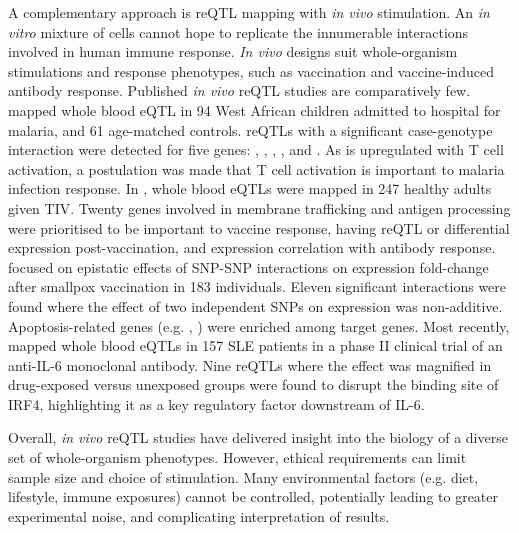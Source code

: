\begin{outline}
A complementary approach is \gls{reQTL} mapping with \textit{in vivo} stimulation.
An \textit{in vitro} mixture of cells cannot hope to replicate the innumerable interactions involved in human immune response.
\textit{In vivo} designs suit whole-organism stimulations and response phenotypes,
such as vaccination and vaccine-induced antibody response.
%
Published \textit{in vivo} \gls{reQTL} studies are comparatively few.
\textcite{idaghdour2012EvidenceAdditiveInteraction} mapped whole blood \gls{eQTL} in 94 West African children admitted to hospital for malaria, and 61 age-matched controls.
\glspl{reQTL} with a significant case-genotype interaction were detected for five genes:
, , , , and .
As  is upregulated with T cell activation, a postulation was made that T cell activation is important to malaria infection response.
In \textcite{franco2013IntegrativeGenomicAnalysis}, whole blood \glspl{eQTL} were mapped in 247 healthy adults given \gls{TIV}.
Twenty genes involved in membrane trafficking and antigen processing were prioritised to be important to vaccine response,
having \gls{reQTL} or differential expression post-vaccination, and expression correlation with antibody response.
\textcite{lareau2016InteractionQuantitativeTrait} focused on epistatic effects of \gls{SNP}-\gls{SNP} interactions on expression fold-change after smallpox vaccination in 183 individuals.
Eleven significant interactions were found where the effect of two independent \glspl{SNP} on expression was non-additive.
Apoptosis-related genes (e.g. , ) were enriched among target genes.
Most recently, \textcite{davenport2018DiscoveringVivoCytokineeQTL}
mapped whole blood \glspl{eQTL} in 157 \gls{SLE} patients in a phase II clinical trial of an anti-IL-6 monoclonal antibody.
Nine \glspl{reQTL} where the effect was magnified in drug-exposed versus unexposed groups
were found to disrupt the binding site of IRF4,
highlighting it as a key regulatory factor downstream of IL-6.

Overall, \textit{in vivo} \gls{reQTL} studies have delivered insight into the biology of a diverse set of whole-organism phenotypes.
However, ethical requirements can limit sample size and choice of stimulation.
Many environmental factors (e.g. diet, lifestyle, immune exposures) cannot be controlled, 
potentially leading to greater experimental noise, and complicating interpretation of results.


\end{outline}
